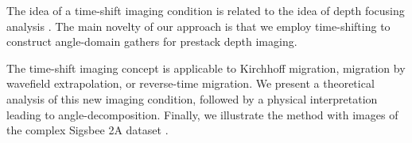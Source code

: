The idea of a time-shift imaging condition is related to the idea of
depth focusing analysis \cite[]{SEG-1986-S7.6,
GEO57-12-16081622,GEO58-08-11481156, SEG-1995-0465,SEG-1996-0463}.
The main novelty of our approach is that we employ time-shifting to
construct angle-domain gathers for prestack depth imaging.

The time-shift imaging concept is applicable to Kirchhoff migration,
migration by wavefield extrapolation, or reverse-time migration.  We
present a theoretical analysis of this new imaging condition, followed
by a physical interpretation leading to angle-decomposition.  Finally,
we illustrate the method with images of the complex Sigsbee 2A dataset
\cite[]{SEG-2002-21222125}.

